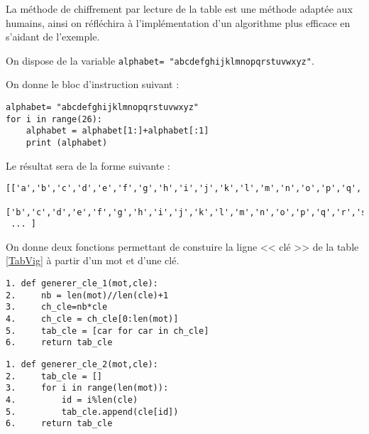 La méthode de chiffrement par lecture de la table est une méthode adaptée \og aux humains\fg, ainsi on réfléchira à l'implémentation d'un algorithme plus efficace en s'aidant de l'exemple.

On dispose de la variable \texttt{alphabet= "abcdefghijklmnopqrstuvwxyz"}. 

On donne le bloc d'instruction suivant : 

\begin{lstlisting}
alphabet= "abcdefghijklmnopqrstuvwxyz"
for i in range(26):
    alphabet = alphabet[1:]+alphabet[:1]
    print (alphabet)
\end{lstlisting}


Le résultat sera de la forme suivante :
\footnotesize{
\begin{lstlisting}
[['a','b','c','d','e','f','g','h','i','j','k','l','m','n','o','p','q','r','s','t','u','v','w','x','y','z'], 
 ['b','c','d','e','f','g','h','i','j','k','l','m','n','o','p','q','r','s','t','u','v','w','x','y','z','a'],
 ... ]
\end{lstlisting}
}

\normalsize

On donne deux fonctions permettant de constuire la ligne << clé >> de la table \ref{TabVig} à partir d'un mot et d'une clé. 
\begin{lstlisting}
1. def generer_cle_1(mot,cle):
2.     nb = len(mot)//len(cle)+1
3.     ch_cle=nb*cle
4.     ch_cle = ch_cle[0:len(mot)]
5.     tab_cle = [car for car in ch_cle]
6.     return tab_cle
\end{lstlisting}

\begin{lstlisting}
1. def generer_cle_2(mot,cle):
2.     tab_cle = []
3.     for i in range(len(mot)):
4.         id = i%len(cle)
5.         tab_cle.append(cle[id])
6.     return tab_cle
\end{lstlisting}




